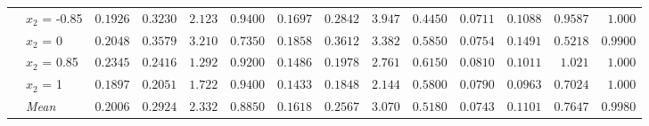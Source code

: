 \begin{table}[htbp]
\begin{tabular}{llrrrrrrrrrrrr}
 & $x_2$ = -0.85 & $0.1926$ & $0.3230$ & $2.123$ & {\boldmath$0.9400$} & $0.1697$ & $0.2842$ & $3.947$ & $0.4450$ & {\boldmath$0.0711$} & {\boldmath$0.1088$} & {\boldmath$0.9587$} & $1.000$ \\
 & $x_2$ = 0 & $0.2048$ & $0.3579$ & $3.210$ & $0.7350$ & $0.1858$ & $0.3612$ & $3.382$ & $0.5850$ & {\boldmath$0.0754$} & {\boldmath$0.1491$} & {\boldmath$0.5218$} & {\boldmath$0.9900$} \\
 & $x_2$ = 0.85 & $0.2345$ & $0.2416$ & $1.292$ & {\boldmath$0.9200$} & $0.1486$ & $0.1978$ & $2.761$ & $0.6150$ & {\boldmath$0.0810$} & {\boldmath$0.1011$} & {\boldmath$1.021$} & $1.000$ \\
 & $x_2$ = 1 & $0.1897$ & $0.2051$ & $1.722$ & {\boldmath$0.9400$} & $0.1433$ & $0.1848$ & $2.144$ & $0.5800$ & {\boldmath$0.0790$} & {\boldmath$0.0963$} & {\boldmath$0.7024$} & $1.000$ \\
 & \textit{Mean} & $0.2006$ & $0.2924$ & $2.332$ & $0.8850$ & $0.1618$ & $0.2567$ & $3.070$ & $0.5180$ & \colorbox{green!20}{\boldmath$0.0743$} & \colorbox{green!20}{\boldmath$0.1101$} & \colorbox{green!20}{\boldmath$0.7647$} & \colorbox{green!20}{\boldmath$0.9980$} \\
\bottomrule
\end{tabular}
\end{table}
